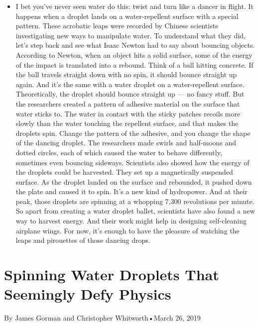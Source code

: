 \begin{itemize}
\tightlist
\item
  I bet you've never seen water do this: twist and turn like a dancer in
  flight. It happens when a droplet lands on a water-repellent surface
  with a special pattern. These acrobatic leaps were recorded by Chinese
  scientists investigating new ways to manipulate water. To understand
  what they did, let's step back and see what Isaac Newton had to say
  about bouncing objects. According to Newton, when an object hits a
  solid surface, some of the energy of the impact is translated into a
  rebound. Think of a ball hitting concrete. If the ball travels
  straight down with no spin, it should bounce straight up again. And
  it's the same with a water droplet on a water-repellent surface.
  Theoretically, the droplet should bounce straight up --- no fancy
  stuff. But the researchers created a pattern of adhesive material on
  the surface that water sticks to. The water in contact with the sticky
  patches recoils more slowly than the water touching the repellent
  surface, and that makes the droplets spin. Change the pattern of the
  adhesive, and you change the shape of the dancing droplet. The
  researchers made swirls and half-moons and dotted circles, each of
  which caused the water to behave differently, sometimes even bouncing
  sideways. Scientists also showed how the energy of the droplets could
  be harvested. They set up a magnetically suspended surface. As the
  droplet landed on the surface and rebounded, it pushed down the plate
  and caused it to spin. It's a new kind of hydropower. And at their
  peak, those droplets are spinning at a whopping 7,300 revolutions per
  minute. So apart from creating a water droplet ballet, scientists have
  also found a new way to harvest energy. And their work might help in
  designing self-cleaning airplane wings. For now, it's enough to have
  the pleasure of watching the leaps and pirouettes of those dancing
  drops.
\end{itemize}

\hypertarget{spinning-water-droplets-that-seemingly-defy-physics-1}{%
\section{Spinning Water Droplets That Seemingly Defy
Physics}\label{spinning-water-droplets-that-seemingly-defy-physics-1}}

By James Gorman and Christopher Whitworth•March 26, 2019

